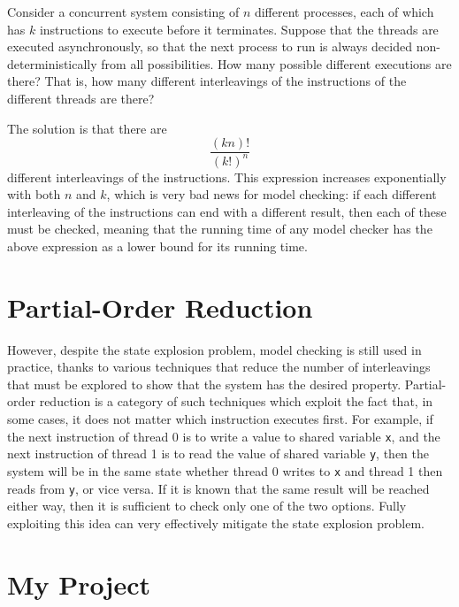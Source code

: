 \documentclass[12pt,a4paper,twoside,openright]{report}
\begin{document}
Consider a concurrent system consisting
of $n$ different processes, each of which
has $k$ instructions to execute before it
terminates. Suppose that the threads are
executed asynchronously, so that the next
process to run is always decided non-deterministically
from all possibilities.
How many possible different executions are there?
That is, how many different interleavings of
the instructions of the different threads are
there?

The solution is that there are
\[\frac{(kn)!}{(k!)^n}\]
different interleavings of the instructions.
This expression increases exponentially with
both $n$ and $k$, which is very bad news for
model checking: if each different interleaving
of the instructions can end with a different
result, then each of these must be checked,
meaning that the running time of any model
checker has the above expression as a lower
bound for its running time.

\section{Partial-Order Reduction}

However, despite the state explosion problem, model
checking is still used in practice, thanks
to various techniques that
reduce the number of interleavings that must
be explored to show that the system has the
desired property. Partial-order reduction
is a category of such techniques which
exploit the fact that, in some cases, it
does not matter which instruction executes
first. For example, if the next instruction
of thread 0 is to write a value to shared
variable \texttt{x}, and the next instruction
of thread 1 is to read
the value of shared variable \texttt{y}, then
the system will be in the same state whether
thread 0 writes to \texttt{x} and thread 1
then reads from \texttt{y}, or vice versa. If
it is known that the same result will be reached
either way, then it is sufficient to check
only one of the two options. Fully exploiting
this idea can very effectively mitigate the
state explosion problem.

\section{My Project}
\end{document}
